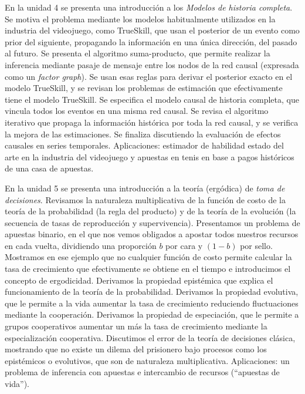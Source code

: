 \documentclass[a4paper,11pt]{book}
\theoremstyle{definition}
\begin{document}
En la unidad 4 se presenta una introducci\'on a los \emph{Modelos de historia completa}.
%
Se motiva el problema mediante los modelos habitualmente utilizados en la industria del videojuego, como TrueSkill, que usan el posterior de un evento como prior del siguiente, propagando la informaci\'on en una \'unica direcci\'on, del pasado al futuro.
%
Se presenta el algoritmo suma-producto, que permite realizar la inferencia mediante pasaje de mensaje entre los nodos de la red causal (expresada como un \emph{factor graph}).
%
Se usan esas reglas para derivar el posterior exacto en el modelo TrueSkill, y se revisan los problemas de estimaci\'on que efectivamente tiene el modelo TrueSkill.
%
Se especifica el modelo causal de historia completa, que vincula todos los eventos en una misma red causal.
%
Se revisa el algoritmo iterativo que propaga la informaci\'on hist\'orica por toda la red causal, y se verifica la mejora de las estimaciones.
%
Se finaliza discutiendo la evaluaci\'on de efectos causales en series temporales.
%
Aplicaciones: estimador de habilidad estado del arte en la industria del videojuego y apuestas en tenis en base a pagos hist\'oricos de una casa de apuestas.


En la unidad 5 se presenta una introducci\'on a la teor\'ia (erg\'odica) de \emph{toma de decisiones}.
%
Revisamos la naturaleza multiplicativa de la funci\'on de costo de la teor\'ia de la probabilidad (la regla del producto) y de la teor\'ia de la evoluci\'on (la secuencia de tasas de reproducci\'on y supervivencia).
%
Presentamos un problema de apuestas binario, en el que nos vemos obligados a apostar todos nuestros recursos en cada vuelta, dividiendo una proporci\'on $b$ por cara y $(1-b)$ por sello.
%
Mostramos en ese ejemplo que no cualquier funci\'on de costo permite calcular la tasa de crecimiento que efectivamente se obtiene en el tiempo e introducimos el concepto de ergodicidad.
%
Derivamos la propiedad epist\'emica que explica el funcionamiento de la teor\'ia de la probabilidad.
%
Derivamos la propiedad evolutiva, que le permite a la vida aumentar la tasa de crecimiento reduciendo fluctuaciones mediante la cooperaci\'on.
%
Derivamos la propiedad de especiaci\'on, que le permite a grupos cooperativos aumentar un m\'as la tasa de crecimiento mediante la especializaci\'on cooperativa.
%
%
Discutimos el error de la teor\'ia de decisiones cl\'asica, mostrando que no existe un dilema del prisionero bajo procesos como los epist\'emicos o evolutivos, que son de naturaleza multiplicativa.
%
Aplicaciones: un problema de inferencia con apuestas e intercambio de recursos (``apuestas de vida'').
\end{document}
